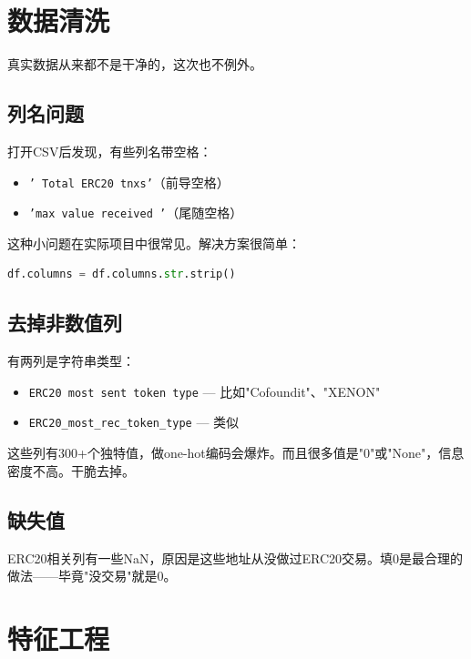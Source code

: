 \documentclass[12pt,a4paper]{article}
\begin{document}
\section{数据清洗}

真实数据从来都不是干净的，这次也不例外。

\subsection{列名问题}

打开CSV后发现，有些列名带空格：
\begin{itemize}
    \item \texttt{' Total ERC20 tnxs'}（前导空格）
    \item \texttt{'max value received '}（尾随空格）
\end{itemize}

这种小问题在实际项目中很常见。解决方案很简单：
\begin{lstlisting}[language=Python]
df.columns = df.columns.str.strip()
\end{lstlisting}

\subsection{去掉非数值列}

有两列是字符串类型：
\begin{itemize}
    \item \texttt{ERC20 most sent token type} — 比如"Cofoundit"、"XENON"
    \item \texttt{ERC20\_most\_rec\_token\_type} — 类似
\end{itemize}

这些列有300+个独特值，做one-hot编码会爆炸。而且很多值是"0"或"None"，信息密度不高。干脆去掉。

\subsection{缺失值}

ERC20相关列有一些NaN，原因是这些地址从没做过ERC20交易。填0是最合理的做法——毕竟"没交易"就是0。

\section{特征工程}
\end{document}
